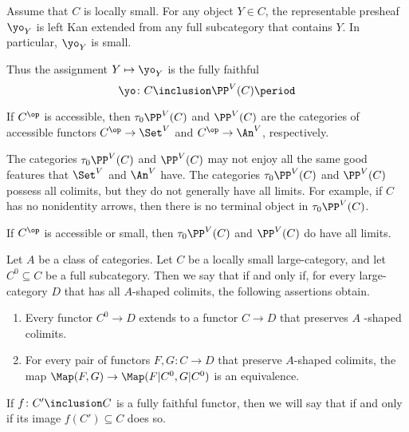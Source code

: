 \begin{eg}
	Assume that $ C $ is locally small.
	For any object $ Y \in C $,
	the representable presheaf $ \yo_Y $ is left Kan extended
	from any full subcategory that contains $ Y $.
	In particular, $ \yo_Y $ is small.

	Thus the assignment $ Y \mapsto \yo_Y $ is
	the fully faithful 
	\[ \yo \colon C \inclusion \PP^V(C) \period \]
\end{eg}

\begin{eg}
	If $ C^{\op} $ is accessible,
	then $ \tau_0\PP^V(C) $ and $ \PP^V(C) $
	are the categories of accessible functors
	$ C^{\op} \to \Set^V $ and $ C^{\op} \to \An^V $, respectively.
\end{eg}

\begin{nul}
	The categories $ \tau_0\PP^V(C) $ and $ \PP^V(C) $
	may not enjoy all the same good features that
	$ \Set^V $ and $ \An^V$ have.
	The categories $ \tau_0\PP^V(C) $ and $ \PP^V(C) $
	possess all colimits,
	but they do not generally have all limits.
	For example, if $C$ has no nonidentity arrows, then
	there is no terminal object in $ \tau_0\PP^V(C) $.
	
	If $ C^{\op} $ is accessible or small,
	then $ \tau_0\PP^V(C) $ and $ \PP^V(C) $ do have all limits.
\end{nul}

\begin{definition}
	Let $ A $ be a class of categories.
	Let $ C $ be a locally small large-category,
	and let $ C^0 \subseteq C $ be a full subcategory.
	Then we say that
	if and only if,
	for every large-category $ D $
	that has all $ A $-shaped colimits,
	the following assertions obtain.
	\begin{enumerate}
		\item Every functor $ C^0 \to D $ extends
			to a functor $ C \to D $
			that preserves $ A $ -shaped colimits.
		\item For every pair of functors
			$ F, G \colon C \to D $
			that preserve $ A $-shaped colimits,
			the map
			$ \Map(F, G) \to \Map(F|C^0, G|C^0 ) $
			is an equivalence.
	\end{enumerate}
	If $ f \colon C' \inclusion C $ is a fully faithful functor,
	then we will say that
	if and only if its image $ f(C') \subseteq C $ does so.
\end{definition}

